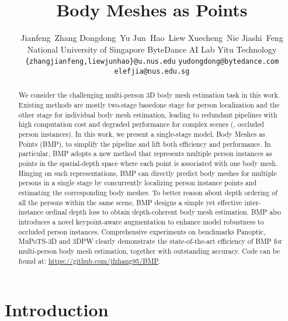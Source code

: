\documentclass[final]{cvpr}
\begin{document}
\title{Body Meshes as Points}

\author{
Jianfeng~Zhang \qquad
Dongdong~Yu    \qquad
Jun~Hao~Liew   \qquad
Xuecheng~Nie   \qquad
Jiashi~Feng  \\
\small{National University of Singapore} \qquad
\small{ByteDance AI Lab} \qquad
\small{Yitu Technology} \\
\small \texttt{\{zhangjianfeng,liewjunhao\}@u.nus.edu} \quad \texttt{yudongdong@bytedance.com}
\quad \texttt{elefjia@nus.edu.sg}
}

\maketitle



\begin{abstract}

We consider the challenging multi-person 3D  body mesh estimation task in this work. Existing methods are mostly two-stage based\textemdash one stage for person localization and the other stage for individual  body mesh estimation, leading to redundant pipelines with high computation cost and degraded performance for complex scenes (\eg,  occluded person instances).   
In this work, we present a single-stage model, Body Meshes as Points (BMP), to simplify the pipeline and lift both efficiency and performance. 
In particular, BMP adopts a new method that represents multiple  person instances as points in the spatial-depth space where each point is associated with one body mesh.
Hinging on such representations,  
BMP can directly predict body meshes for multiple persons in a single stage by concurrently localizing person instance points and estimating the corresponding body meshes.
To better reason about depth ordering of all the persons within the same scene, BMP designs a simple yet effective inter-instance ordinal depth loss to obtain depth-coherent  body mesh estimation. 
BMP also introduces a novel keypoint-aware augmentation to   enhance model robustness to occluded person instances. 
Comprehensive experiments on benchmarks Panoptic, MuPoTS-3D and 3DPW clearly demonstrate the state-of-the-art efficiency of BMP for multi-person body mesh estimation, together with outstanding accuracy. Code can be found at: \url{https://github.com/jfzhang95/BMP}.

\end{abstract} \section{Introduction}
\end{document}

